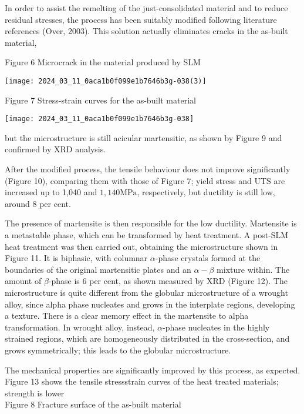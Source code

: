 \documentclass[10pt]{article}
\begin{document}
In order to assist the remelting of the just-consolidated material and to reduce residual stresses, the process has been suitably modified following literature references (Over, 2003). This solution actually eliminates cracks in the as-built material,

Figure 6 Microcrack in the material produced by SLM

\begin{center}
\texttt{[image: 2024\_03\_11\_0aca1b0f099e1b7646b3g-038(3)]}
\end{center}

Figure 7 Stress-strain curves for the as-built material

\begin{center}
\texttt{[image: 2024\_03\_11\_0aca1b0f099e1b7646b3g-038]}
\end{center}

but the microstructure is still acicular martensitic, as shown by Figure 9 and confirmed by XRD analysis.

After the modified process, the tensile behaviour does not improve significantly (Figure 10), comparing them with those of Figure 7; yield stress and UTS are increased up to 1,040 and $1,140 \mathrm{MPa}$, respectively, but ductility is still low, around 8 per cent.

The presence of martensite is then responsible for the low ductility. Martensite is a metastable phase, which can be transformed by heat treatment. A post-SLM heat treatment was then carried out, obtaining the microstructure shown in Figure 11. It is biphasic, with columnar $\alpha$-phase crystals formed at the boundaries of the original martensitic plates and an $\alpha-\beta$ mixture within. The amount of $\beta$-phase is 6 per cent, as shown measured by XRD (Figure 12). The microstructure is quite different from the globular microstructure of a wrought alloy, since alpha phase nucleates and grows in the interplate regions, developing a texture. There is a clear memory effect in the martensite to alpha transformation. In wrought alloy, instead, $\alpha$-phase nucleates in the highly strained regions, which are homogeneously distributed in the cross-section, and grows symmetrically; this leads to the globular microstructure.

The mechanical properties are significantly improved by this process, as expected. Figure 13 shows the tensile stressstrain curves of the heat treated materials; strength is lower\\
Figure 8 Fracture surface of the as-built material
\end{document}
